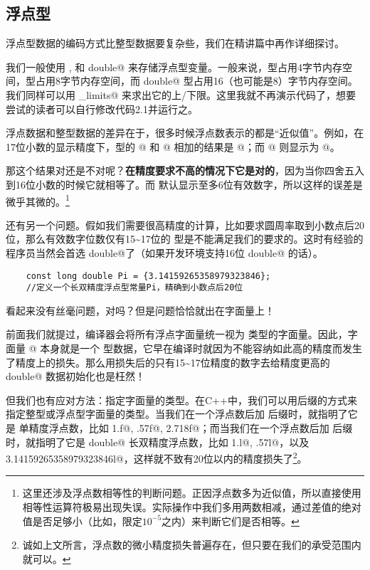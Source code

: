 \subsection*{浮点型}
浮点型数据的编码方式比整型数据要复杂些，我们在精讲篇中再作详细探讨。\par
我们一般使用 \lstinline@float@, \lstinline@double@ 和 \lstinline@long double@ 来存储浮点型变量。一般来说，\lstinline@float@ 型占用4字节内存空间，\lstinline@double@ 型占用8字节内存空间，而 \lstinline@long double@ 型占用16（也可能是8）字节内存空间。我们同样可以用 \lstinline@numeric_limits@ 来求出它的上/下限。这里我就不再演示代码了，想要尝试的读者可以自行修改代码2.1并运行之。\par
浮点数据和整型数据的差异在于，很多时候浮点数表示的都是``近似值''。例如，在17位小数的显示精度下，\lstinline@double@ 型的 @ 和 @ 相加的结果是 @；而 @ 则显示为 @。\par
那这个结果对还是不对呢？\textbf{在精度要求不高的情况下它是对的}，因为当你四舍五入到16位小数的时候它就相等了。而 \lstinline@cout@ 默认显示至多6位有效数字，所以这样的误差是微乎其微的。\footnote{这里还涉及浮点数相等性的判断问题。正因浮点数多为近似值，所以直接使用相等性运算符极易出现失误。实际操作中我们多用两数相减，通过差值的绝对值是否足够小（比如，限定$10^{-5}$之内）来判断它们是否相等。}\par
还有另一个问题。假如我们需要很高精度的计算，比如要求圆周率取到小数点后20位，那么有效数字位数仅有15\~{}17位的 \lstinline@double@ 型是不能满足我们的要求的。这时有经验的程序员当然会首选 \lstinline@long double@了（如果开发环境支持16位 \lstinline@long double@ 的话）。
\begin{lstlisting}
    const long double Pi = {3.14159265358979323846};
    //定义一个长双精度浮点型常量Pi，精确到小数点后20位
\end{lstlisting}
看起来没有丝毫问题，对吗？但是问题恰恰就出在字面量上！\par
前面我们就提过，编译器会将所有浮点字面量统一视为 \lstinline@double@ 类型的字面量。因此，字面量 @ 本身就是一个 \lstinline@double@ 型数据，它早在编译时就因为不能容纳如此高的精度而发生了精度上的损失。那么用损失后的只有15\~{}17位精度的数字去给精度更高的 \lstinline@long double@ 数据初始化也是枉然！\par
但我们也有应对方法：指定字面量的类型。在C++中，我们可以用后缀的方式来指定整型或浮点型字面量的类型。当我们在一个浮点数后加 \lstinline@f@ 后缀时，就指明了它是 \lstinline@float@ 单精度浮点数，比如 \lstinline@1.f@, \lstinline@.57f@, \lstinline@2.718f@；而当我们在一个浮点数后加 \lstinline@l@ 后缀时，就指明了它是 \lstinline@long double@ 长双精度浮点数，比如 \lstinline@1.l@, \lstinline@.57l@，以及 \lstinline@3.14159265358979323846l@，这样就不致有20位以内的精度损失了\footnote{诚如上文所言，浮点数的微小精度损失普遍存在，但只要在我们的承受范围内就可以。}。\par
